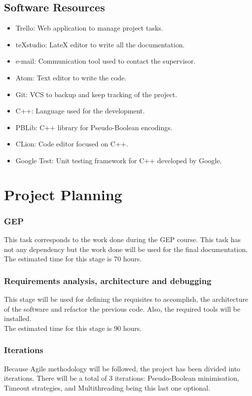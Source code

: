 \subsection{Software Resources}
\begin{itemize}
	\item Trello: Web application to manage project tasks.
	\item teXstudio: LateX editor to write all the documentation.
	\item e-mail: Communication tool used to contact the supervisor. 
	\item Atom: Text editor to write the code.
	\item Git: VCS to backup and keep tracking of the project.
	\item C++: Language used for the development.
	\item PBLib: C++ library for Pseudo-Boolean encodings.
	\item CLion: Code editor focused on C++.
	\item Google Test: Unit testing framework for C++ developed by Google.
\end{itemize}

\section{Project Planning}

\subsubsection{GEP}
This task corresponds to the work done during the GEP course. This task has not any dependency but the work done will be used for the final documentation.\\

The estimated time for this stage is 70 hours.
\subsubsection{Requirements analysis, architecture and debugging}
This stage will be used for defining the requisites to accomplish, the architecture of the software and refactor the previous code. Also, the required tools will be installed. \\

The estimated time for this stage is 90 hours.
\subsubsection{Iterations}
Because Agile methodology will be followed, the project has been divided into iterations. There will be a total of 3 iterations: Pseudo-Boolean minimisation, Timeout strategies, and Multithreading being this last one optional. \\

